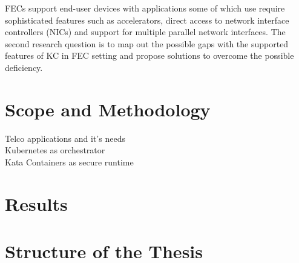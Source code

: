 FECs support end-user devices with applications some of which use require sophisticated features such as accelerators, direct access to network interface controllers (NICs) and support for multiple parallel network interfaces. The second research question is to map out the possible gaps with the supported features of KC in FEC setting and propose solutions to overcome the possible deficiency.





\section{Scope and Methodology}
\label{section:intro_scopemethodology}

Telco applications and it's needs \\
Kubernetes as orchestrator \\
Kata Containers as secure runtime \\



\section{Results}
\label{section:intro_results}


\section{Structure of the Thesis}
\label{section:intro_structure}

